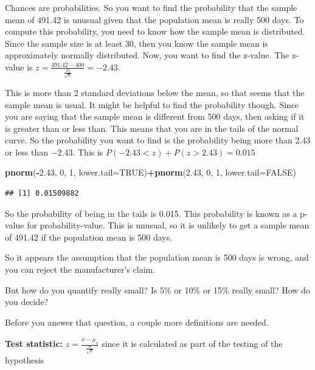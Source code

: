 \documentclass[]{book}
\newenvironment{Shaded}{\begin{snugshade}}{\end{snugshade}}
\newcommand{\DataTypeTok}[1]{\textcolor[rgb]{0.13,0.29,0.53}{#1}}
\newcommand{\DecValTok}[1]{\textcolor[rgb]{0.00,0.00,0.81}{#1}}
\newcommand{\FloatTok}[1]{\textcolor[rgb]{0.00,0.00,0.81}{#1}}
\newcommand{\KeywordTok}[1]{\textcolor[rgb]{0.13,0.29,0.53}{\textbf{#1}}}
\newcommand{\NormalTok}[1]{#1}
\newcommand{\OperatorTok}[1]{\textcolor[rgb]{0.81,0.36,0.00}{\textbf{#1}}}
\newcommand{\OtherTok}[1]{\textcolor[rgb]{0.56,0.35,0.01}{#1}}
\begin{document}
Chances are probabilities. So you want to find the probability that the sample mean of 491.42 is unusual given that the population mean is really 500 days. To compute this probability, you need to know how the sample mean is distributed. Since the sample size is at least 30, then you know the sample mean is approximately normally distributed. Now, you want to find the z-value. The z-value is \(z=\frac{491.42-400}{\frac{25}{\sqrt{n}}}=-2.43\).

This is more than 2 standard deviations below the mean, so that seems that the sample mean is usual. It might be helpful to find the probability though. Since you are saying that the sample mean is different from 500 days, then asking if it is greater than or less than. This means that you are in the tails of the normal curve. So the probability you want to find is the probability being more than 2.43 or less than \(-2.43\). This is \(P(-2.43<z)+P(z>2.43)=0.015\)

\begin{Shaded}
\begin{Highlighting}[]
\KeywordTok{pnorm}\NormalTok{(}\OperatorTok{-}\FloatTok{2.43}\NormalTok{, }\DecValTok{0}\NormalTok{, }\DecValTok{1}\NormalTok{, }\DataTypeTok{lower.tail=}\OtherTok{TRUE}\NormalTok{)}\OperatorTok{+}\KeywordTok{pnorm}\NormalTok{(}\FloatTok{2.43}\NormalTok{, }\DecValTok{0}\NormalTok{, }\DecValTok{1}\NormalTok{, }\DataTypeTok{lower.tail=}\OtherTok{FALSE}\NormalTok{)}
\end{Highlighting}
\end{Shaded}

\begin{verbatim}
## [1] 0.01509882
\end{verbatim}

So the probability of being in the tails is 0.015. This probability is known as a p-value for probability-value. This is unusual, so it is unlikely to get a sample mean of 491.42 if the population mean is 500 days.

So it appears the assumption that the population mean is 500 days is wrong, and you can reject the manufacturer's claim.

But how do you quantify really small? Is 5\% or 10\% or 15\% really small? How do you decide?

Before you answer that question, a couple more definitions are needed.

\textbf{Test statistic:} \(z=\frac{\bar{x}-\mu_o}{\frac{\sigma}{\sqrt{n}}}\) since it is calculated as part of the testing of the hypothesis
\end{document}
